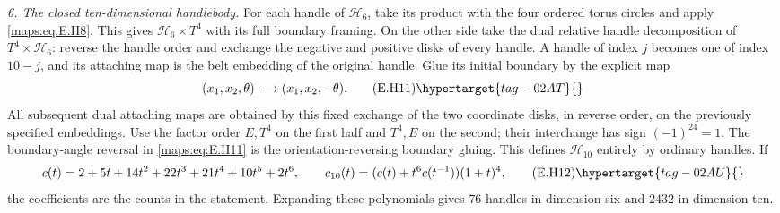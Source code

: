 \begin{theorem}
\emph{6. The closed ten-dimensional handlebody.}
For each handle of $\mathcal H_6$, take its product with the four
ordered torus circles and apply \eqref{maps:eq:E.H8}.  This gives
$\mathcal H_6\times T^4$ with its full boundary framing.  On the
other side take the dual relative handle decomposition of
$T^4\times\mathcal H_6$: reverse the handle order and exchange
the negative and positive disks of every handle.  A handle of
index $j$ becomes one of index $10-j$, and its attaching map is
the belt embedding of the original handle.  Glue its
initial boundary by the explicit map
\[
                 (x_1,x_2,\theta)\longmapsto
                                    (x_1,x_2,-\theta).
 \tag{E.H11}\hypertarget{tag-02AT}{}\label{maps:eq:E.H11}
\]
All subsequent dual attaching maps are obtained by this fixed
exchange of the two coordinate disks, in reverse order, on the
previously specified embeddings.  Use the factor order $E,T^4$
on the first half and $T^4,E$ on the second; their interchange
has sign $(-1)^{24}=1$.  The boundary-angle reversal in \eqref{maps:eq:E.H11}
is the orientation-reversing boundary gluing.  This defines
$\mathcal H_{10}$ entirely by ordinary handles.  If
\[
 c(t)=2+5t+14t^2+22t^3+21t^4+10t^5+2t^6,
 \qquad
       c_{10}(t)=(c(t)+t^6c(t^{-1}))(1+t)^4,
 \tag{E.H12}\hypertarget{tag-02AU}{}\label{maps:eq:E.H12}
\]
the coefficients are the counts in the statement.  Expanding these polynomials gives $76$ handles in dimension six
and $2432$ in dimension ten.

\end{theorem}


